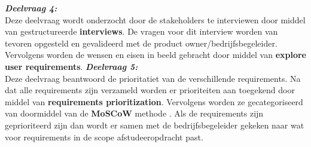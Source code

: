 \textit{\textbf{Deelvraag 4:} \SubquestionFour} \\
Deze deelvraag wordt onderzocht door de stakeholders te interviewen door middel van gestructureerde \textbf{interviews}. 
De vragen voor dit interview worden van tevoren opgesteld en gevalideerd met de product owner/bedrijfsbegeleider.
Vervolgens worden de wensen en eisen in beeld gebracht door middel van \textbf{explore user requirements}.
\whitespace
\textit{\textbf{Deelvraag 5:} \SubquetionFive} \\
Deze deelvraag beantwoord de prioritatiet van de verschillende requirements.
Na dat alle requirements zijn verzameld worden er prioriteiten aan toegekend door middel van \textbf{requirements prioritization}.
Vervolgens worden ze  gecategoriseerd van doormiddel van de \textbf{MoSCoW} methode \Parencite{MoSCoW}. 
Als de requirements zijn geprioriteerd zijn dan wordt er samen met de bedrijfsbegeleider gekeken naar wat voor requirements in de scope afstudeeropdracht past.
